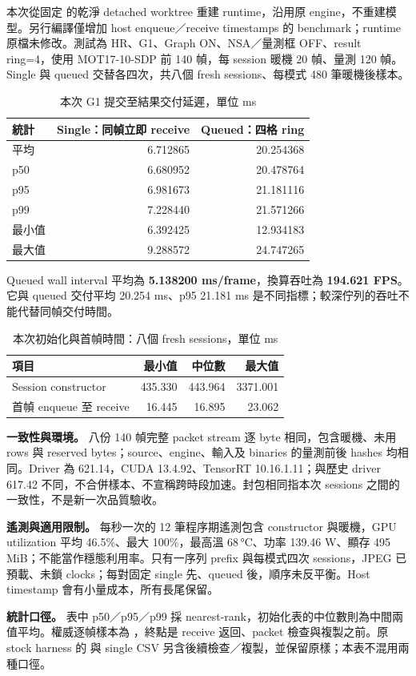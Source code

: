 本次從固定  的乾淨 detached worktree 重建 runtime，沿用原 engine，不重建模型。另行編譯僅增加 host enqueue／receive timestamps 的 benchmark；runtime 原檔未修改。測試為 HR、G1、Graph ON、NSA／量測框 OFF、result ring=4，使用 MOT17-10-SDP 前 140 幀，每 session 暖機 20 幀、量測 120 幀。Single 與 queued 交替各四次，共八個 fresh sessions、每模式 480 筆暖機後樣本。\cite{live}

\begin{table}[H]
\caption{本次 G1 提交至結果交付延遲，單位 ms}
\small
\noindent\begin{tabularx}{\textwidth}{@{}Yrr@{}}
\toprule
統計 & Single：同幀立即 receive & Queued：四格 ring \\
\midrule
平均 & 6.712865 & 20.254368 \\
p50 & 6.680952 & 20.478764 \\
p95 & 6.981673 & 21.181116 \\
p99 & 7.228440 & 21.571266 \\
最小值 & 6.392425 & 12.934183 \\
最大值 & 9.288572 & 24.747265 \\
\bottomrule
\end{tabularx}
\end{table}

Queued wall interval 平均為 \textbf{5.138200 ms/frame}，換算吞吐為 \textbf{194.621 FPS}。它與 queued 交付平均 20.254 ms、p95 21.181 ms 是不同指標；較深佇列的吞吐不能代替同幀交付時間。

\begin{table}[H]
\caption{本次初始化與首幀時間：八個 fresh sessions，單位 ms}
\small
\noindent\begin{tabularx}{\textwidth}{@{}Yrrr@{}}
\toprule
項目 & 最小值 & 中位數 & 最大值 \\
\midrule
Session constructor & 435.330 & 443.964 & 3371.001 \\
首幀 enqueue 至 receive & 16.445 & 16.895 & 23.062 \\
\bottomrule
\end{tabularx}
\end{table}

\textbf{一致性與環境。} 八份 140 幀完整 packet stream 逐 byte 相同，包含暖機、未用 rows 與 reserved bytes；source、engine、輸入及 binaries 的量測前後 hashes 均相同。Driver 為 621.14，CUDA 13.4.92、TensorRT 10.16.1.11；與歷史 driver 617.42 不同，不合併樣本、不宣稱跨時段加速。封包相同指本次 sessions 之間的一致性，不是新一次品質驗收。

\textbf{遙測與適用限制。} 每秒一次的 12 筆程序期遙測包含 constructor 與暖機，GPU utilization 平均 46.5\%、最大 100\%，最高溫 68\,°C、功率 139.46 W、顯存 495 MiB；不能當作穩態利用率。只有一序列 prefix 與每模式四次 sessions，JPEG 已預載、未鎖 clocks；每對固定 single 先、queued 後，順序未反平衡。Host timestamp 會有小量成本，所有長尾保留。

\textbf{統計口徑。} 表中 p50／p95／p99 採 nearest-rank，初始化表的中位數則為中間兩值平均。權威逐幀樣本為 ，終點是 receive 返回、packet 檢查與複製之前。原 stock harness 的  與 single CSV 另含後續檢查／複製，並保留原樣；本表不混用兩種口徑。

